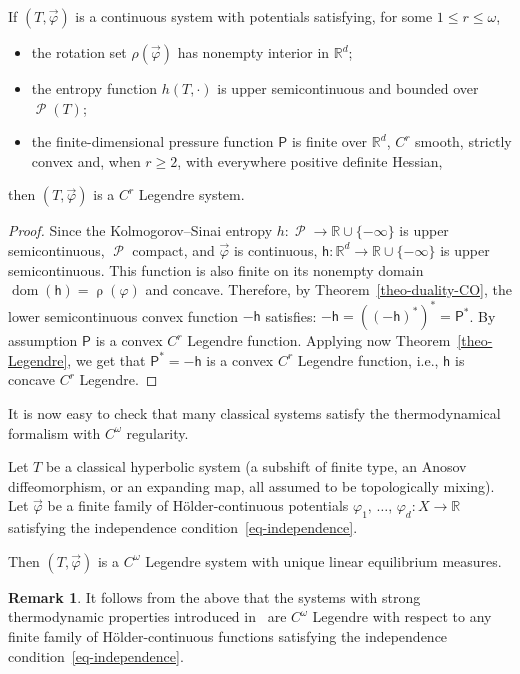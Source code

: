 \documentclass[10pt]{amsart}
\theoremstyle{definition}\newtheorem{defi}[theo]{Definition}\newtheorem{rema}[theo]{Remark}\newtheorem{exam}[theo]{Example}\newtheorem{exem}[theo]{Example}\newtheorem{nota}[theo]{Notation}
\theoremstyle{plain}
\theoremstyle{plain}
\newcommand\vpot{\vec\pot}
\newcommand\dom{\operatorname{dom}}
\newcommand\Prob{{\operatorname{\mathscr{P}}}}
\newcommand{\rs}{\operatorname{\rho}}
\newcommand{\hf}{\mathsf{h}}
\newcommand{\Pf}{\mathsf{P}}
\newcommand{\pot}{\varphi}
\newcommand*\8{\infty}
\newcommand\RR{\mathbb{R}}
\begin{document}
\begin{prop}\label{prop:nlem0}
If $(T,\vpot)$ is a continuous system with potentials satisfying, for some $1\leq r\leq\omega$,
\begin{itemize}
\item the rotation set $\rho(\vpot)$ has nonempty interior {in $\RR^d$};
\item the entropy function $h(T,\cdot)$ is upper semicontinuous and bounded over $\Prob(T)$;
\item the finite-dimensional pressure {function} $\Pf$ is finite over $\RR^d$, $C^r$ smooth, strictly convex and, when $r\ge 2$, with everywhere positive definite Hessian,
\end{itemize}
then $(T,\vpot)$ is a $C^r$ Legendre system.
\end{prop}

\begin{proof}
Since the Kolmogorov--Sinai entropy $h:\Prob\to\RR\cup\{-\infty\}$ is upper semicontinuous, $\Prob$ compact, and $\vpot$ is continuous, $\hf:\RR^d\to\RR\cup\{-\infty\}$ is upper semicontinuous. This function is also finite on its nonempty domain $\dom(\hf)=\rs(\pot)$ and concave. Therefore, by Theorem~\ref{theo-duality-CO}, the lower semicontinuous convex function $-\hf$ satisfies: $-\hf=((-\hf)^*)^*=\Pf^*$. By assumption $\Pf$ is a convex $C^r$ Legendre function. Applying now Theorem~\ref{theo-Legendre}, we get that $\Pf^*=-\hf$ is a convex $C^r$ Legendre function, i.e., $\hf$ is concave $C^r$ Legendre.
\end{proof}

It is now easy to check that many classical systems satisfy the thermodynamical formalism with $C^\omega$ regularity.



\begin{coro}\label{coro3.12}
Let $T$ be a classical hyperbolic system (a subshift of finite type, an Anosov diffeomorphism, or an expanding map, all assumed to be topologically mixing). Let $\vpot$ be a finite family of H\"older-continuous potentials $\pot_1,\,\dots,\,\pot_d:X\to\RR$ satisfying the independence condition~\eqref{eq-independence}.

Then $(T,\vpot)$ is a $C^\omega$ Legendre system with unique linear equilibrium measures.
\end{coro}



\begin{rema}\label{rem-KW2015}
It follows from the above that the systems with strong thermodynamic properties introduced in~\cite{KW2015} are $C^\omega$ Legendre with respect to any finite family of H\"older-continuous functions satisfying the independence condition~\eqref{eq-independence}.
\end{rema}
\end{document}
